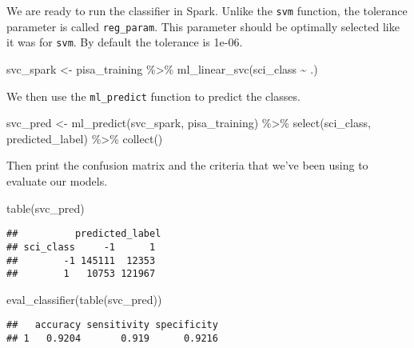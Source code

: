 \documentclass[
]{book}
\newenvironment{Shaded}{\begin{snugshade}}{\end{snugshade}}
\newcommand{\FunctionTok}[1]{\textcolor[rgb]{0.00,0.00,0.00}{#1}}
\newcommand{\NormalTok}[1]{#1}
\newcommand{\OtherTok}[1]{\textcolor[rgb]{0.56,0.35,0.01}{#1}}
\newcommand{\SpecialCharTok}[1]{\textcolor[rgb]{0.00,0.00,0.00}{#1}}
\begin{document}
We are ready to run the classifier in Spark. Unlike the \texttt{svm} function, the tolerance parameter is called \texttt{reg\_param}. This parameter should be optimally selected like it was for \texttt{svm}. By default the tolerance is 1e-06.

\begin{Shaded}
\begin{Highlighting}[]
\NormalTok{svc\_spark }\OtherTok{\textless{}{-}}\NormalTok{ pisa\_training }\SpecialCharTok{\%\textgreater{}\%} 
  \FunctionTok{ml\_linear\_svc}\NormalTok{(sci\_class }\SpecialCharTok{\textasciitilde{}}\NormalTok{ .)}
\end{Highlighting}
\end{Shaded}

We then use the \texttt{ml\_predict} function to predict the classes.

\begin{Shaded}
\begin{Highlighting}[]
\NormalTok{svc\_pred }\OtherTok{\textless{}{-}} \FunctionTok{ml\_predict}\NormalTok{(svc\_spark, pisa\_training) }\SpecialCharTok{\%\textgreater{}\%} 
  \FunctionTok{select}\NormalTok{(sci\_class, predicted\_label) }\SpecialCharTok{\%\textgreater{}\%} 
  \FunctionTok{collect}\NormalTok{()}
\end{Highlighting}
\end{Shaded}

Then print the confusion matrix and the criteria that we've been using to evaluate our models.

\begin{Shaded}
\begin{Highlighting}[]
\FunctionTok{table}\NormalTok{(svc\_pred)}
\end{Highlighting}
\end{Shaded}

\begin{verbatim}
##          predicted_label
## sci_class     -1      1
##        -1 145111  12353
##        1   10753 121967
\end{verbatim}

\begin{Shaded}
\begin{Highlighting}[]
\FunctionTok{eval\_classifier}\NormalTok{(}\FunctionTok{table}\NormalTok{(svc\_pred))}
\end{Highlighting}
\end{Shaded}

\begin{verbatim}
##   accuracy sensitivity specificity
## 1   0.9204       0.919      0.9216
\end{verbatim}
\end{document}
